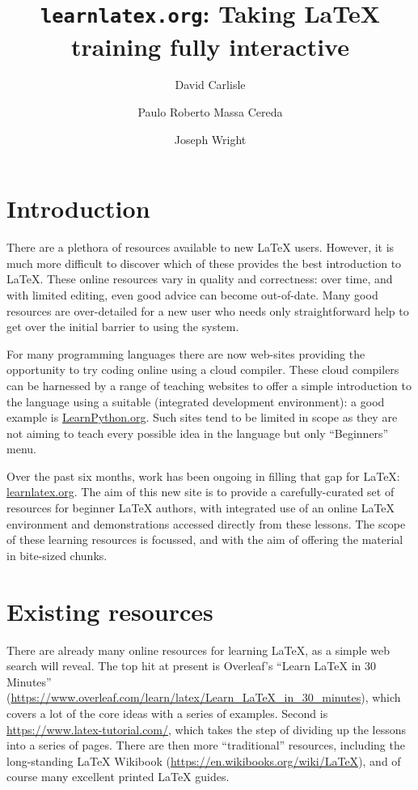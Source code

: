 \documentclass[harvardcite]{ltugboat}
\title{\texttt{learnlatex.org}: Taking \LaTeX{} training fully interactive}
\author{David Carlisle}
\author{Paulo Roberto Massa Cereda}
\author{Joseph Wright}
\begin{document}
\maketitle

\section{Introduction}

There are a plethora of resources available to new \LaTeX{} users. However, it
is much more difficult to discover which of these provides the best
introduction to \LaTeX{}. These online resources vary in quality and correctness:
over time, and with limited editing, even good advice can become out-of-date.
Many good resources are over-detailed for a new user who needs only
straightforward help to get over the initial barrier to using the system.

For many programming languages there are now web-sites providing the
opportunity to try coding online using a cloud compiler. These cloud compilers
can be harnessed by a range of teaching websites to offer a simple introduction
to the language using a suitable  (integrated development
environment): a good example is \url{LearnPython.org}. Such sites tend to be
limited in scope as they are not aiming to teach every possible idea in the
language but only \enquote{Beginners} menu.

Over the past six months, work has been ongoing in filling that gap for
\LaTeX{}: \url{learnlatex.org}. The aim of this new site is to provide a
carefully-curated set of resources for beginner \LaTeX{} authors, with integrated
use of an online \LaTeX{} environment and demonstrations accessed directly from
these lessons. The scope of these learning resources is focussed, and with the
aim of offering the material in bite-sized chunks.

\section{Existing resources}

There are already many online resources for learning \LaTeX{}, as a simple web
search will reveal. The top hit at present is Overleaf's \enquote{Learn
\LaTeX{} in 30 Minutes}
(\url{https://www.overleaf.com/learn/latex/Learn_LaTeX_in_30_minutes}), which
covers a lot of the core ideas with a series of examples. Second is
\url{https://www.latex-tutorial.com/}, which takes the step of dividing up the
lessons into a series of pages. There are then more \enquote{traditional}
resources, including the long-standing \LaTeX{} Wikibook
(\url{https://en.wikibooks.org/wiki/LaTeX}), and of course many excellent
printed \LaTeX{} guides.
\end{document}
